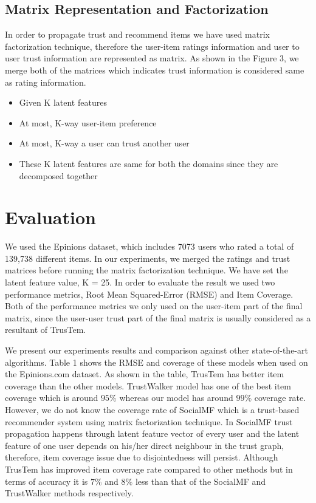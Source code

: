 \documentclass[11pt, conference, onecolumn]{IEEEtran}
\begin{document}
\subsection{Matrix Representation and Factorization}
In order to propagate trust and recommend items we have used matrix factorization technique, therefore the user-item ratings information and user to user trust information are represented as matrix. As shown in the Figure 3, we merge both of the matrices which indicates trust information is considered same as rating information. 
\begin{itemize}
\item Given K latent features
\item At most, K-way user-item preference
\item At most, K-way  a user can trust another user
\item These K latent features are same for both the domains since they are decomposed together
\end{itemize}

\section{Evaluation}
We used the Epinions dataset, which includes 7073 users who rated a total of 139,738 different items. In our experiments, we merged the ratings and trust matrices before running the matrix factorization technique. We have set the latent feature value, K = 25. In order to evaluate the result we used two performance metrics, Root Mean Squared-Error (RMSE) and Item Coverage. Both of the performance metrics we only used on the user-item part of the final matrix, since the user-user trust part of the final matrix is usually considered as a resultant of TrusTem.

We present our experiments results and comparison against other state-of-the-art algorithms. Table 1 shows the RMSE and coverage of these models when used on the Epinions.com dataset. 
As shown in the table, TrusTem has better item coverage than the other models. TrustWalker model has one of the best item coverage which is around $95\%$ whereas our model has around $99\%$ coverage rate. However, we do not know the coverage rate of SocialMF which is a trust-based recommender system using matrix factorization technique. In SocialMF trust propagation happens through latent feature vector of every user and the latent feature of one user depends on his/her direct neighbour in the trust graph, therefore, item coverage issue due to disjointedness will persist. Although TrusTem has improved item coverage rate compared to other methods but in terms of accuracy it is $7\%$ and $8\%$ less than that of the SocialMF and TrustWalker methods respectively.
\end{document}

